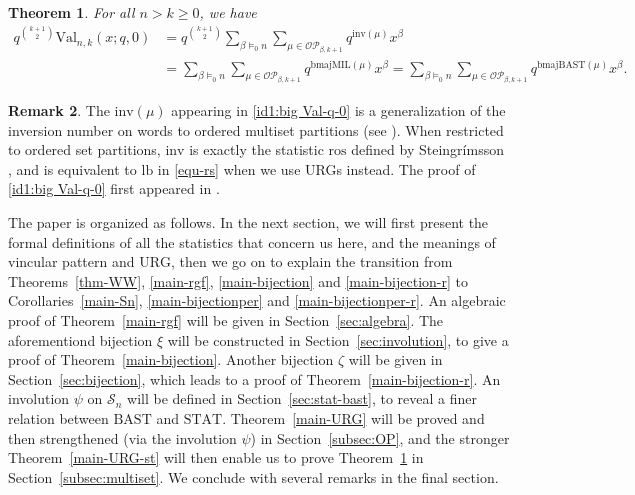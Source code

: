 \documentclass[12pt]{amsart}
\numberwithin{equation}{section}
\theoremstyle{plain}
\newtheorem{theorem}{Theorem}[section]
\theoremstyle{definition}
\newtheorem{remark}[theorem]{Remark}
\def\inv{\mathrm{inv}}
\def\STAT{\mathrm{STAT}}
\def\BAST{\mathrm{BAST}}
\def\bmajMIL{\mathrm{bmajMIL}}
\def\bmajBAST{\mathrm{bmajBAST}}
\def\Val{\mathrm{Val}}
\def\ros{\mathrm{ros}}
\def\lb{\mathrm{lb}}
\def\SS{\mathcal{S}}
\def\OP{\mathcal{OP}}
\begin{document}
\begin{theorem}\label{main-OMP}
For all $n>k\ge0$, we have
\begin{align}\label{id1:big Val-q-0}
q^{\binom{k+1}{2}}\Val_{n,k}(x;q,0)&=q^{\binom{k+1}{2}}\sum_{\beta\models_0 n}\sum_{\mu\in\OP_{\beta,k+1}}q^{\inv(\mu)}x^{\beta}\\
&=\sum_{\beta\models_0 n}\sum_{\mu\in\OP_{\beta,k+1}}q^{\bmajMIL(\mu)}x^{\beta}=\sum_{\beta\models_0 n}\sum_{\mu\in\OP_{\beta,k+1}}q^{\bmajBAST(\mu)}x^{\beta}.\label{id2:big Val-q-0}
\end{align}
\end{theorem}
\begin{remark}\label{rmk:inv}
The $\inv(\mu)$ appearing in \eqref{id1:big Val-q-0} is a generalization of the inversion number on words to ordered multiset partitions (see \cite{Wils,HRW,RW,Rh}). When restricted to ordered set partitions, $\inv$ is exactly the statistic $\ros$ defined by Steingr\'imsson \cite{Ste}, and is equivalent to $\lb$ in \eqref{equ-rs} when we use URGs instead. The proof of \eqref{id1:big Val-q-0} first appeared in \cite[Prop.~4.1, Eq.~(49)]{HRW}.
\end{remark}

The paper is organized as follows. In the next section, we will first present the formal definitions of all the statistics that concern us here, and the meanings of vincular pattern and $\mathrm{URG}$, then we go on to explain the transition from Theorems~\ref{thm-WW}, \ref{main-rgf}, \ref{main-bijection} and \ref{main-bijection-r} to Corollaries~\ref{main-Sn}, \ref{main-bijectionper} and \ref{main-bijectionper-r}. An algebraic proof of Theorem~\ref{main-rgf} will be given in Section~\ref{sec:algebra}. The aforementiond bijection $\xi$ will be constructed in Section~\ref{sec:involution}, to give a proof of Theorem~\ref{main-bijection}.
Another bijection $\zeta$ will be given in Section~\ref{sec:bijection}, which leads to a proof of Theorem~\ref{main-bijection-r}. An involution $\psi$ on $\SS_n$ will be defined in Section~\ref{sec:stat-bast}, to reveal a finer relation between $\BAST$ and $\STAT$. Theorem~\ref{main-URG} will be proved and then strengthened (via the involution $\psi$) in Section~\ref{subsec:OP}, and the stronger Theorem~\ref{main-URG-st} will then enable us to prove Theorem~\ref{main-OMP} in Section~\ref{subsec:multiset}. We conclude with several remarks in the final section.

 
\end{document}
